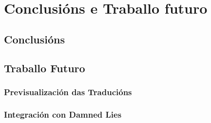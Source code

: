 \chapter{Conclusións e Traballo futuro}

\section{Conclusións}

\section{Traballo Futuro}
\subsection{Previsualización das Traducións}
\subsection{Integración con Damned Lies}
